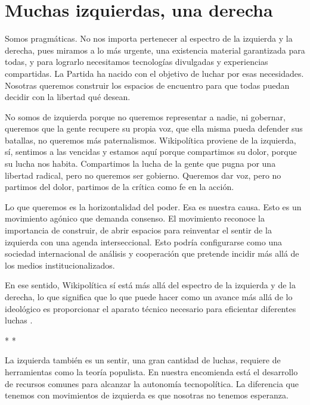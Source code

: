 \hypertarget{muchas-izquierdas-una-derecha}{%
\section{Muchas izquierdas, una
derecha}\label{muchas-izquierdas-una-derecha}}

Somos pragmáticas. No nos importa pertenecer al espectro de la izquierda
y la derecha, pues miramos a lo más urgente, una existencia material
garantizada para todas, y para lograrlo necesitamos tecnologías
divulgadas y experiencias compartidas. La Partida ha nacido con el
objetivo de luchar por esas necesidades. Nosotras queremos construir los
espacios de encuentro para que todas puedan decidir con la libertad qué
desean.

No somos de izquierda porque no queremos representar a nadie, ni
gobernar, queremos que la gente recupere su propia voz, que ella misma
pueda defender sus batallas, no queremos más paternalismos. Wikipolítica
proviene de la izquierda, sí, sentimos a las vencidas y estamos aquí
porque compartimos su dolor, porque su lucha nos habita. Compartimos la
lucha de la gente que pugna por una libertad radical, pero no queremos
ser gobierno. Queremos dar voz, pero no partimos del dolor, partimos de
la crítica como fe en la acción.

Lo que queremos es la horizontalidad del poder. Esa es nuestra causa.
Esto es un movimiento agónico que demanda consenso. El movimiento
reconoce la importancia de construir, de abrir espacios para reinventar
el sentir de la izquierda con una agenda interseccional. Esto podría
configurarse como una sociedad internacional de análisis y cooperación
que pretende incidir más allá de los medios institucionalizados.

En ese sentido, Wikipolítica sí está más allá del espectro de la
izquierda y de la derecha, lo que significa que lo que puede hacer como
un avance más allá de lo ideológico es proporcionar el aparato técnico
necesario para eficientar diferentes
luchas \cite{Tiqqun2014}.

\begin{center}
    * *
\end{center}

La izquierda también es un sentir, una gran cantidad de luchas, requiere
de herramientas como la teoría populista. En nuestra encomienda está el
desarrollo de recursos comunes para alcanzar la autonomía tecnopolítica.
La diferencia que tenemos con movimientos de izquierda es que nosotras
no tenemos esperanza.

